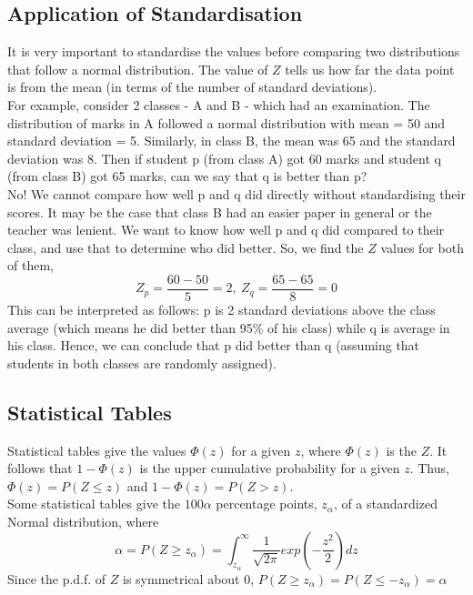\subsection{Application of Standardisation}
It is very important to standardise the values before comparing two distributions that follow a normal distribution. The value of $Z$ tells us how far the data point is from the mean (in terms of the number of standard deviations). \\
For example, consider 2 classes - A and B - which had an examination. The distribution of marks in A followed a normal distribution with mean = 50 and standard deviation = 5. Similarly, in class B, the mean was 65 and the standard deviation was 8. Then if student p (from class A) got 60 marks and student q (from class B) got 65 marks, can we say that q is better than p? \\
No! We cannot compare how well p and q did directly without standardising their scores. It may be the case that class B had an easier paper in general or the teacher was lenient. We want to know how well p and q did compared to their class, and use that to determine who did better. So, we find the $Z$ values for both of them, 
$$
Z_p = \dfrac{60 - 50}{5} = 2, \ Z_q = \dfrac{65 - 65}{8} = 0
$$
This can be interpreted as follows: p is 2 standard deviations above the class average (which means he did better than 95\% of his class) while q is average in his class. Hence, we can conclude that p did better than q (assuming that students in both classes are randomly assigned).
\subsection{Statistical Tables}

Statistical tables give the values $\Phi(z)$ for a given $z$, where $\Phi(z)$ is the {} $Z$. It follows that $1 - \Phi(z)$ is the upper cumulative probability for a given $z$. Thus, $\Phi(z) = P(Z \leq z)$ and $1 - \Phi(z) = P(Z > z)$. \\
Some statistical tables give the $100\alpha$ percentage points, $z_\alpha$, of a standardized Normal distribution, where 
$$
\alpha = P(Z \geq z_\alpha) = \int_{z_\alpha}^{\infty}\dfrac{1}{\sqrt{2\pi}} exp \left( - \dfrac{z^2}{2}\right) dz
$$
Since the p.d.f. of $Z$ is symmetrical about 0, $P(Z \geq z_{\alpha}) = P(Z \leq -z_{\alpha}) = \alpha$
